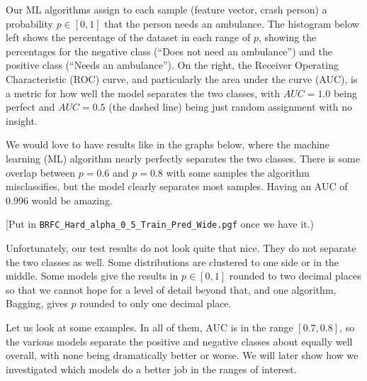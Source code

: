 
Our ML algorithms assign to each sample (feature vector, crash person) a probability $p \in [0,1]$ that the person needs an ambulance.  The histogram below left shows the percentage of the dataset in each range of $p$, showing the percentages for the negative class (``Does not need an ambulance'') and the positive class (``Needs an ambulance'').  On the right, the Receiver Operating Characteristic (ROC) curve, and particularly the area under the curve (AUC), is a metric for how well the model separates the two classes, with $AUC=1.0$ being perfect and $AUC=0.5$ (the dashed line) being just random assignment with no insight.  

We would love to have results like in the graphs below, where the machine learning (ML) algorithm nearly perfectly separates the two classes.  There is some overlap between $p=0.6$ and $p=0.8$ with some samples the algorithm misclassifies, but the model clearly separates most samples.  Having an AUC of 0.996 would be amazing.  

[Put in \verb|BRFC_Hard_alpha_0_5_Train_Pred_Wide.pgf| once we have it.)

\begin{comment}

\noindent\begin{tabular}{@{\hspace{-6pt}}p{4.3in} @{\hspace{-6pt}}p{2.0in}}
	\vskip 0pt
	\hfil Raw Model Output
	
		
&
	\vskip 0pt
	\hfil ROC Curve
	
	
	
\end{tabular}
\end{comment}

Unfortunately, our test results do not look quite that nice.  They do not separate the two classes as well.  Some distributions are clustered to one side or in the middle.  Some models give the results in $p \in [0,1]$ rounded to two decimal places so that we cannot hope for a level of detail beyond that, and one algorithm, Bagging, gives $p$ rounded to only one decimal place.  

Let us look at some examples.  In all of them, AUC is in the range $[0.7,0.8]$, so the various models separate the positive and negative classes about equally well overall, with none being dramatically better or worse.  We will later show how we investigated which models do a better job in the ranges of interest.  

